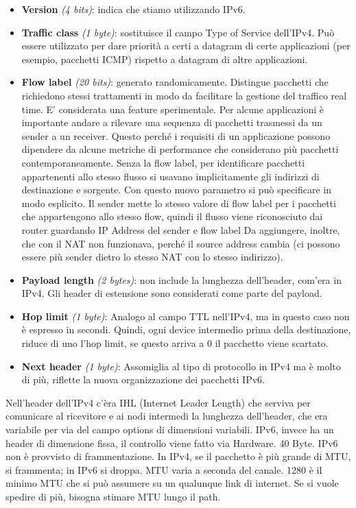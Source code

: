\documentclass{article}
\begin{document}
\begin{itemize}
    \item \textbf{Version} \textit{(4 bits)}: indica che stiamo utilizzando IPv6.
    \item \textbf{Traffic class} \textit{(1 byte)}: sostituisce il campo Type of Service dell’IPv4. Può essere utilizzato per dare priorità a certi a datagram di certe applicazioni (per esempio, pacchetti ICMP) rispetto a datagram di altre applicazioni.
    \item \textbf{Flow label} \textit{(20 bits)}: generato randomicamente. Distingue pacchetti che richiedono stessi trattamenti in modo da facilitare la gestione del traffico real time. E’ considerata una feature sperimentale. Per alcune applicazioni è importante andare a rilevare una sequenza di pacchetti trasmessi da un sender a un receiver. Questo perché i requisiti di un applicazione possono dipendere da alcune metriche di performance che considerano più pacchetti contemporaneamente. Senza la flow label, per identificare pacchetti appartenenti allo stesso flusso si usavano implicitamente gli indirizzi di destinazione e sorgente. Con questo nuovo parametro si può specificare in modo esplicito. Il sender mette lo stesso valore di flow label per i pacchetti che appartengono allo stesso flow, quindi il flusso viene riconosciuto dai router guardando IP Address del sender e flow label Da aggiungere, inoltre, che con il NAT non funzionava, perché il source address cambia (ci possono essere più sender dietro lo stesso NAT con lo stesso indirizzo).
    \item \textbf{Payload length} \textit{(2 bytes)}: non include la lunghezza dell’header, com’era in IPv4. Gli header di estensione sono considerati come parte del payload.
    \item \textbf{Hop limit} \textit{(1 byte)}: Analogo al campo TTL nell’IPv4, ma in questo caso non è espresso in secondi. Quindi, ogni device intermedio prima della destinazione, riduce di uno l’hop limit, se questo arriva a 0 il pacchetto viene scartato.
    \item \textbf{Next header} \textit{(1 byte)}: Assomiglia al tipo di protocollo in IPv4 ma è molto di più, riflette la nuova organizzazione dei pacchetti IPv6.
\end{itemize}

Nell’header dell’IPv4 c’èra IHL (Internet Leader Length) che serviva per comunicare al ricevitore e ai nodi intermedi la lunghezza dell’header, che era variabile per via del campo options di dimensioni variabili. IPv6, invece ha un header di dimensione fissa, il controllo viene fatto via Hardware. 40 Byte. IPv6 non è provvisto di frammentazione. In IPv4, se il pacchetto è più grande di MTU, si frammenta; in IPv6 si droppa. MTU varia a seconda del canale. 1280 è il minimo MTU che si può assumere su un qualunque link di internet. Se si vuole spedire di più, bisogna stimare MTU lungo il path. 
\end{document}
